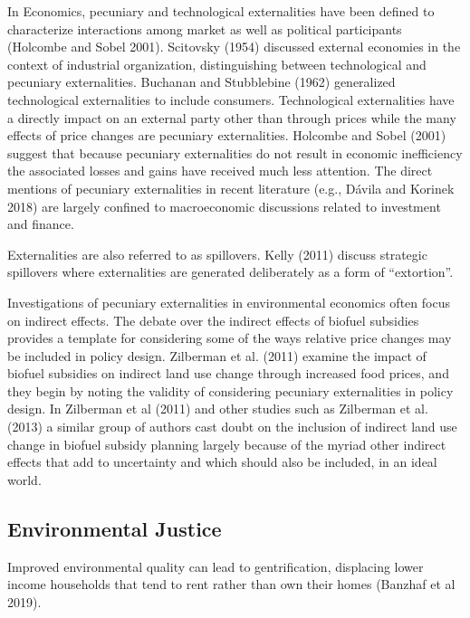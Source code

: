 \documentclass[ecta,nameyear,draft]{econsocart}
\theoremstyle{plain}
\theoremstyle{remark}
\begin{document}
In Economics, pecuniary and technological externalities have been defined to characterize interactions among market as well as political participants (Holcombe and Sobel 2001). Scitovsky (1954) discussed external economies in the context of industrial organization, distinguishing between technological and pecuniary externalities. Buchanan and Stubblebine (1962) generalized technological externalities to include consumers. Technological externalities have a directly impact on an external party other than through prices while the many effects of price changes are pecuniary externalities. Holcombe and Sobel (2001) suggest that because pecuniary externalities do not result in economic inefficiency the associated losses and gains have received much less attention. The direct mentions of pecuniary externalities in recent literature (e.g., Dávila and Korinek 2018) are largely confined to macroeconomic discussions related to investment and finance. 

Externalities are also referred to as spillovers. Kelly (2011) discuss strategic spillovers where externalities are generated deliberately as a form of “extortion”. 

Investigations of pecuniary externalities in environmental economics often focus on indirect effects. The debate over the indirect effects of biofuel subsidies provides a template for considering some of the ways relative price changes may be included in policy design. Zilberman et al. (2011) examine the impact of biofuel subsidies on indirect land use change through increased food prices, and they begin by noting the validity of considering pecuniary externalities in policy design. In Zilberman et al (2011) and other studies such as Zilberman et al. (2013) a similar group of authors cast doubt on the inclusion of indirect land use change in biofuel subsidy planning largely because of the myriad other indirect effects that add to uncertainty and which should also be included, in an ideal world. 





\subsection{Environmental Justice} 

Improved environmental quality can lead to gentrification, displacing lower income households that tend to rent rather than own their homes (Banzhaf et al 2019). 	 
\end{document}
